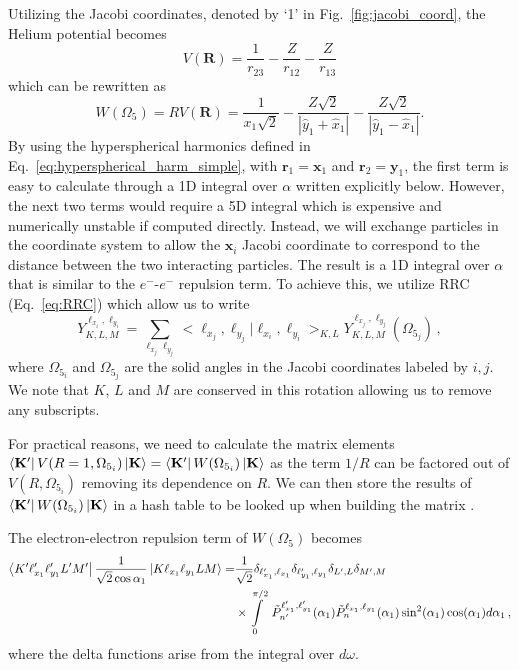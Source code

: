 Utilizing the Jacobi coordinates, denoted by `1' in Fig.~\ref{fig:jacobi_coord}, the Helium potential becomes
\begin{equation}
    V(\mathbf{R}) = \frac{1}{r_{23}} - \frac{Z}{r_{12}} - \frac{Z}{r_{13}}
\end{equation}
which can be rewritten as 
\begin{equation}
    W(\Omega_5) = R V(\mathbf{R}) = \frac{1}{x_1\sqrt{2}} - \frac{Z\sqrt{2}}{|\hat{y}_1+\hat{x}_1|} - \frac{Z\sqrt{2}}{|\hat{y}_1-\hat{x}_1|}.
\end{equation}
By using the hyperspherical harmonics defined in Eq.~\ref{eq:hyperspherical_harm_simple}, with $\mathbf{r}_1=\mathbf{x}_1$ and $\mathbf{r}_2=\mathbf{y}_1$, the first term is easy to calculate through a 1D integral over $\alpha$ written explicitly below. However, the next two terms would require a 5D integral which is expensive and numerically unstable if computed directly. Instead, we will exchange particles in the coordinate system to allow the $\mathbf{x}_i$ Jacobi coordinate to correspond to the distance between the two interacting particles. The result is a 1D integral over $\alpha$ that is similar to the $e^-$-$e^-$ repulsion term. To achieve this, we utilize RRC (Eq.~\ref{eq:RRC}) which allow us to write
\begin{equation}
    Y^{\ell_{x_i},\ell_{y_i}}_{K,L,M} = \sum\limits_{\ell_{x_j}\ell_{y_j}} <\ell_{x_j},\ell_{y_j}|\ell_{x_i},\ell_{y_i}>_{K,L} Y^{\ell_{x_j},\ell_{y_j}}_{K,L,M}(\Omega_{5_j})\, ,
\end{equation}
where $\Omega_{5_i}$ and $\Omega_{5_j}$ are the solid angles in the Jacobi coordinates labeled by $i,j$. We note that $K$, $L$ and $M$ are conserved in this rotation allowing us to remove any subscripts. 

For practical reasons, we need to calculate the matrix elements $\bra{\mathbf{K}'}V(R=1,\Omega_{5_i})\ket{\mathbf{K}} = \bra{\mathbf{K}'}W(\Omega_{5_i})\ket{\mathbf{K}}$ as the term $1/R$ can be factored out of $V(R,\Omega_{5_i})$ removing its dependence on $R$. We can then store the results of $\bra{\mathbf{K}'}W(\Omega_{5_i})\ket{\mathbf{K}}$ in a hash table to be looked up when building the matrix \cite{khan2015}.

The electron-electron repulsion term of $W(\Omega_5)$ becomes
\begin{align}
    \bra{K'\ell_{x_1}'\ell_{y_1}'L'M'} \frac{1}{\sqrt{2}\cos\alpha_1} \ket{K \ell_{x_1} \ell_{y_1}LM} =& \frac{1}{\sqrt{2}} \delta_{\ell_{x_1}',\ell_{x_1}} \delta_{\ell_{y_1}',\ell_{y_1}} \delta_{L',L} \delta_{M',M} \\
    & \times \int\limits_0^{\pi/2}\ \tilde{P}^{\ell_{x_1}',\ell_{y_1}'}_{n'}(\alpha_1) \tilde{P}^{\ell_{x_1},\ell_{y_1}}_{n}(\alpha_1) \sin^2(\alpha_1) \cos(\alpha_1)d\alpha_1\, ,
\end{align}
where the delta functions arise from the integral over $d\omega$.

